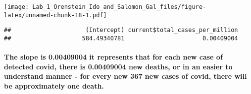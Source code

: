 \documentclass[
]{article}
\newenvironment{Shaded}{\begin{snugshade}}{\end{snugshade}}
\newcommand{\AttributeTok}[1]{\textcolor[rgb]{0.77,0.63,0.00}{#1}}
\newcommand{\ConstantTok}[1]{\textcolor[rgb]{0.00,0.00,0.00}{#1}}
\newcommand{\DecValTok}[1]{\textcolor[rgb]{0.00,0.00,0.81}{#1}}
\newcommand{\FunctionTok}[1]{\textcolor[rgb]{0.00,0.00,0.00}{#1}}
\newcommand{\NormalTok}[1]{#1}
\newcommand{\SpecialCharTok}[1]{\textcolor[rgb]{0.00,0.00,0.00}{#1}}
\newcommand{\StringTok}[1]{\textcolor[rgb]{0.31,0.60,0.02}{#1}}
\begin{document}
\begin{Shaded}
\end{Shaded}

\texttt{[image: Lab\_1\_Orenstein\_Ido\_and\_Salomon\_Gal\_files/figure-latex/unnamed-chunk-18-1.pdf]}

\begin{Shaded}
\end{Shaded}

\begin{verbatim}
##                     (Intercept) current$total_cases_per_million 
##                    584.49340781                      0.00409004
\end{verbatim}

\hypertarget{the-slope-is-0.00409004-it-represents-that-for-each-new-case-of-detected-covid-there-is-0.00409004-new-deaths-or-in-an-easier-to-understand-manner---for-every-new-367-new-cases-of-covid-there-will-be-approximately-one-death.}{%
\paragraph{The slope is 0.00409004 it represents that for each new case
of detected covid, there is 0.00409004 new deaths, or in an easier to
understand manner - for every new 367 new cases of covid, there will be
approximately one
death.}\label{the-slope-is-0.00409004-it-represents-that-for-each-new-case-of-detected-covid-there-is-0.00409004-new-deaths-or-in-an-easier-to-understand-manner---for-every-new-367-new-cases-of-covid-there-will-be-approximately-one-death.}}
\end{document}
